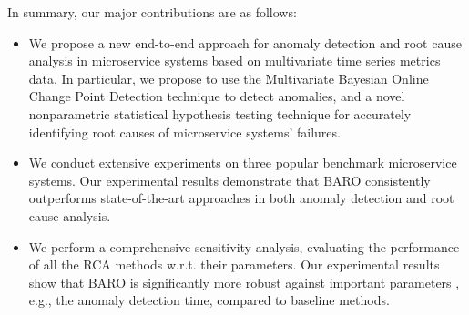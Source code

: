 In summary, our major contributions are as follows: 
\begin{itemize}
    \item We propose a new end-to-end approach for anomaly detection and root cause analysis in microservice systems based on multivariate time series metrics data. In particular, we propose to use the Multivariate Bayesian Online Change Point Detection technique to detect anomalies, and a novel nonparametric statistical hypothesis testing technique for %
    accurately identifying root causes of microservice systems' failures.
    \item We conduct extensive experiments on three popular benchmark microservice systems. Our experimental results demonstrate that BARO consistently outperforms state-of-the-art approaches in both anomaly detection and root cause analysis.
    \item We perform a comprehensive sensitivity analysis, evaluating the performance of all the RCA methods w.r.t. their parameters. Our experimental results show that BARO is significantly more robust against important parameters%
    , e.g., the anomaly detection time, compared to baseline methods.
\end{itemize}

